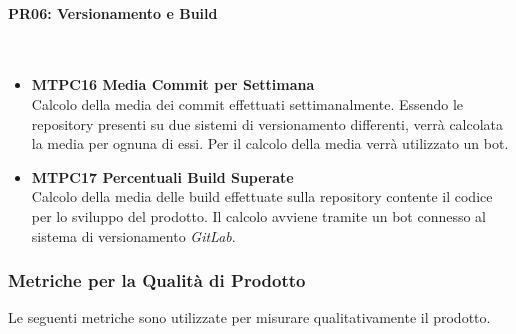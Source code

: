 \paragraph{PR06: Versionamento e Build} ~\\
\begin{itemize}
	\item \textbf{MTPC16 Media Commit per Settimana} ~\\
	Calcolo della media dei commit effettuati settimanalmente. Essendo le repository presenti su due sistemi di versionamento differenti, verrà calcolata la media per ognuna di essi. Per il calcolo della media verrà utilizzato un bot.
	\item \textbf{MTPC17 Percentuali Build Superate} ~\\
	Calcolo della media delle build effettuate sulla repository contente il codice per lo sviluppo del prodotto. Il calcolo avviene tramite un bot connesso al sistema di versionamento \textit{GitLab}. 
\end{itemize}

\subsubsection{Metriche per la Qualità di Prodotto}
Le seguenti metriche sono utilizzate per misurare qualitativamente il prodotto.

\iffalse
\paragraph{MTTS15 Numero di Test Eseguiti per Requisito}\-\\
\fi

